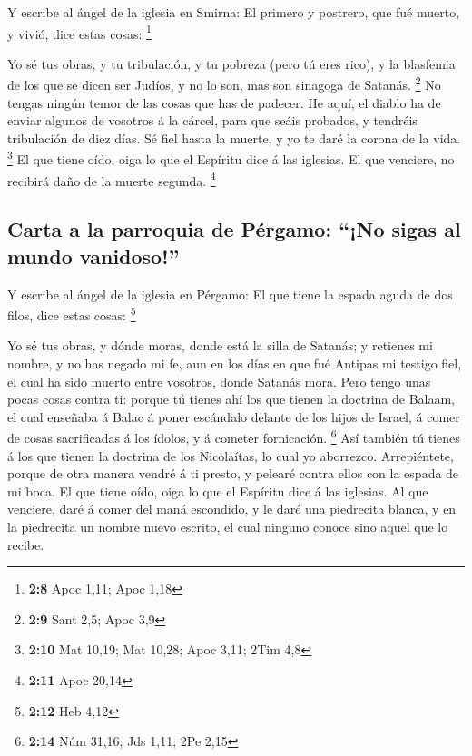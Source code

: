 Y escribe al ángel de la iglesia en Smirna: El primero y
postrero, que fué muerto, y vivió, dice estas cosas: \footnote{\textbf{2:8}
  Apoc 1,11; Apoc 1,18}

 Yo sé tus obras, y tu tribulación, y tu pobreza (pero tú
eres rico), y la blasfemia de los que se dicen ser Judíos, y no lo son,
mas son sinagoga de Satanás. \footnote{\textbf{2:9} Sant 2,5; Apoc 3,9}
 No tengas ningún temor de las cosas que has de padecer.
He aquí, el diablo ha de enviar algunos de vosotros á la cárcel, para
que seáis probados, y tendréis tribulación de diez días. Sé fiel hasta
la muerte, y yo te daré la corona de la vida. \footnote{\textbf{2:10}
  Mat 10,19; Mat 10,28; Apoc 3,11; 2Tim 4,8}  El que
tiene oído, oiga lo que el Espíritu dice á las iglesias. El que
venciere, no recibirá daño de la muerte segunda. \footnote{\textbf{2:11}
  Apoc 20,14}

\hypertarget{carta-a-la-parroquia-de-puxe9rgamo-no-sigas-al-mundo-vanidoso}{%
\subsection{Carta a la parroquia de Pérgamo: ``¡No sigas al mundo
vanidoso!''}\label{carta-a-la-parroquia-de-puxe9rgamo-no-sigas-al-mundo-vanidoso}}

 Y escribe al ángel de la iglesia en Pérgamo: El que
tiene la espada aguda de dos filos, dice estas cosas: \footnote{\textbf{2:12}
  Heb 4,12}

 Yo sé tus obras, y dónde moras, donde está la silla de
Satanás; y retienes mi nombre, y no has negado mi fe, aun en los días en
que fué Antipas mi testigo fiel, el cual ha sido muerto entre vosotros,
donde Satanás mora.  Pero tengo unas pocas cosas contra
ti: porque tú tienes ahí los que tienen la doctrina de Balaam, el cual
enseñaba á Balac á poner escándalo delante de los hijos de Israel, á
comer de cosas sacrificadas á los ídolos, y á cometer fornicación.
\footnote{\textbf{2:14} Núm 31,16; Jds 1,11; 2Pe 2,15} 
Así también tú tienes á los que tienen la doctrina de los Nicolaítas, lo
cual yo aborrezco.  Arrepiéntete, porque de otra manera
vendré á ti presto, y pelearé contra ellos con la espada de mi boca.
 El que tiene oído, oiga lo que el Espíritu dice á las
iglesias. Al que venciere, daré á comer del maná escondido, y le daré
una piedrecita blanca, y en la piedrecita un nombre nuevo escrito, el
cual ninguno conoce sino aquel que lo recibe.

